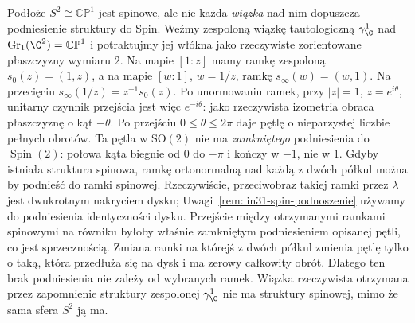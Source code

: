 \begin{przyklad}
\label{prz:lin31-nie-spin-linia}
Podłoże $S^2\cong\mathbb{CP}^1$ jest spinowe,
ale nie każda \emph{wiązka} nad nim dopuszcza
podniesienie struktury do Spin.
Weźmy zespoloną wiązkę tautologiczną
$\gamma^1_\C$ nad
$\operatorname{Gr}_1(\C^2)=\mathbb{CP}^1$
i potraktujmy jej włókna jako rzeczywiste
zorientowane płaszczyzny wymiaru $2$.
Na mapie $[1:z]$ mamy ramkę zespoloną
$s_0(z)=(1,z)$, a na mapie $[w:1]$,
$w=1/z$, ramkę $s_\infty(w)=(w,1)$.
Na przecięciu
$s_\infty(1/z)=z^{-1}s_0(z)$.
Po unormowaniu ramek, przy $|z|=1$, $z=e^{i\theta}$, unitarny
czynnik przejścia jest więc $e^{-i\theta}$:
jako rzeczywista izometria obraca płaszczyznę
o kąt $-\theta$. Po przejściu
$0\leq\theta\leq2\pi$ daje pętlę
o nieparzystej liczbie pełnych obrotów.
Ta pętla w $\mathrm{SO}(2)$ nie ma
\emph{zamkniętego} podniesienia do $\operatorname{Spin}(2)$:
połowa kąta biegnie
od $0$ do $-\pi$ i kończy w $-1$, nie w $1$.
Gdyby istniała struktura spinowa, ramkę ortonormalną nad każdą
z dwóch półkul można by podnieść do ramki spinowej.
Rzeczywiście, przeciwobraz takiej ramki przez $\lambda$ jest
dwukrotnym nakryciem dysku; Uwagi~\ref{rem:lin31-spin-podnoszenie}
używamy do podniesienia identyczności dysku. Przejście między
otrzymanymi ramkami spinowymi na równiku byłoby właśnie
zamkniętym podniesieniem opisanej pętli, co jest sprzecznością.
Zmiana ramki na którejś z dwóch półkul
zmienia pętlę tylko o taką, która przedłuża
się na dysk i ma zerowy całkowity obrót.
Dlatego ten brak podniesienia nie zależy
od wybranych ramek. Wiązka rzeczywista otrzymana przez zapomnienie
struktury zespolonej $\gamma^1_\C$ nie ma struktury
spinowej, mimo że sama sfera $S^2$ ją ma.
\end{przyklad}


